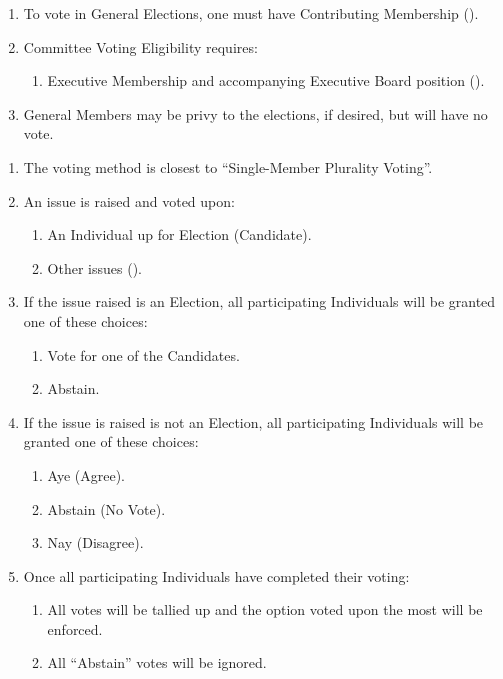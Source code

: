 
\begin{enumerate}
	\item To vote in General Elections, one must have Contributing Membership ().

	\item Committee Voting Eligibility requires:
		\begin{enumerate}
			\item Executive Membership and accompanying Executive Board position ().
		\end{enumerate}

	\item General Members may be privy to the elections, if desired, but will have
		no vote.
\end{enumerate}

\begin{enumerate}
	\item The voting method is closest to ``Single-Member Plurality Voting''.

	\item An issue is raised and voted upon:
		\begin{enumerate}
			\item An Individual up for Election (Candidate).

			\item Other issues ().
		\end{enumerate}

	\item If the issue raised is an Election, all participating Individuals will
		be granted one of these choices:
		\begin{enumerate}
			\item Vote for one of the Candidates.

			\item Abstain.
		\end{enumerate}

	\item If the issue is raised is not an Election, all participating Individuals
		will be granted one of these choices:
		\begin{enumerate}
			\item Aye (Agree).

			\item Abstain (No Vote).

			\item Nay (Disagree).
		\end{enumerate}

	\item Once all participating Individuals have completed their voting:
		\begin{enumerate}
			\item All votes will be tallied up and the option voted upon the most will
				be enforced.

			\item All ``Abstain'' votes will be ignored.
		\end{enumerate}
\end{enumerate}

